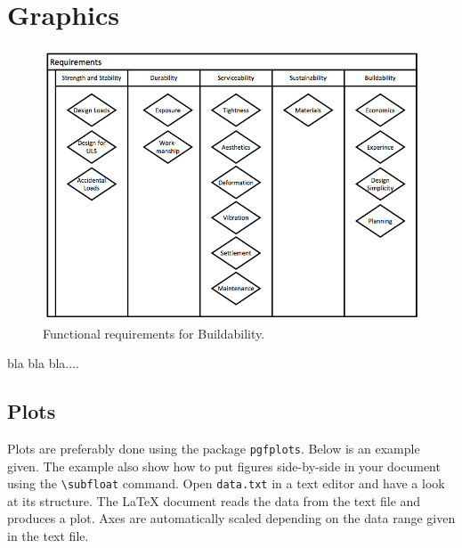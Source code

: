 

\chapter{Graphics}

\begin{figure}[H]
\centering
\includegraphics[scale=0.4]{figures/GR-FR.png}
\caption{Functional requirements for Buildability.}
\label{figure:test}
\end{figure}

bla bla bla....

\section{Plots}
Plots are preferably done using the package \texttt{pgfplots}. Below is an example given. The example also show how to put figures side-by-side in your document using the \texttt{\textbackslash subfloat} command. Open \texttt{data.txt} in a text editor and have a look at its structure. The \LaTeX{} document reads the data from the text file and produces a plot. Axes are automatically scaled depending on the data range given in the text file. 

